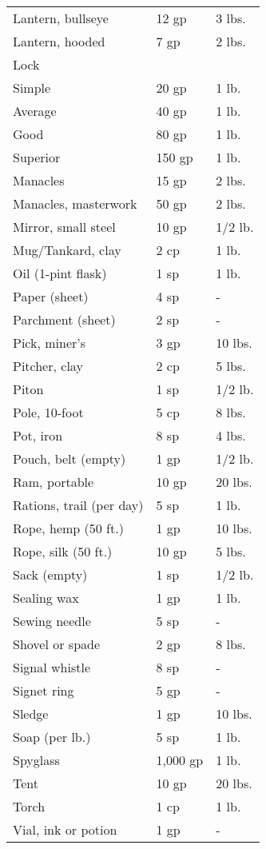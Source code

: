 \begin{xtabular}{lll}
 Lantern, bullseye & 12 gp & 3 lbs. \\
 Lantern, hooded & 7 gp & 2 lbs. \\
 Lock  \\
 Simple & 20 gp & 1 lb. \\
 Average & 40 gp & 1 lb. \\
 Good & 80 gp & 1 lb. \\
 Superior & 150 gp & 1 lb. \\
 Manacles & 15 gp & 2 lbs. \\
 Manacles, masterwork & 50 gp & 2 lbs. \\
 Mirror, small steel & 10 gp & 1/2 lb. \\
 Mug/Tankard, clay & 2 cp & 1 lb. \\
 Oil (1-pint flask) & 1 sp & 1 lb. \\
 Paper (sheet) & 4 sp & - \\
 Parchment (sheet) & 2 sp & - \\
 Pick, miner's & 3 gp & 10 lbs. \\
 Pitcher, clay & 2 cp & 5 lbs. \\
 Piton & 1 sp & 1/2 lb. \\
 Pole, 10-foot & 5 cp & 8 lbs. \\
 Pot, iron & 8 sp & 4 lbs. \\
 Pouch, belt (empty) & 1 gp & 1/2 lb. \\
 Ram, portable & 10 gp & 20 lbs. \\
 Rations, trail (per day) & 5 sp & 1 lb. \\
 Rope, hemp (50 ft.) & 1 gp & 10 lbs. \\
 Rope, silk (50 ft.) & 10 gp & 5 lbs. \\
 Sack (empty) & 1 sp & 1/2 lb. \\
 Sealing wax & 1 gp & 1 lb. \\
 Sewing needle & 5 sp & - \\
 Shovel or spade & 2 gp & 8 lbs. \\
 Signal whistle & 8 sp & - \\
 Signet ring & 5 gp & - \\
 Sledge & 1 gp & 10 lbs. \\
 Soap (per lb.) & 5 sp & 1 lb. \\
 Spyglass & 1,000 gp & 1 lb. \\
 Tent & 10 gp & 20 lbs. \\
 Torch & 1 cp & 1 lb. \\
 Vial, ink or potion & 1 gp & - \\

\end{xtabular}
